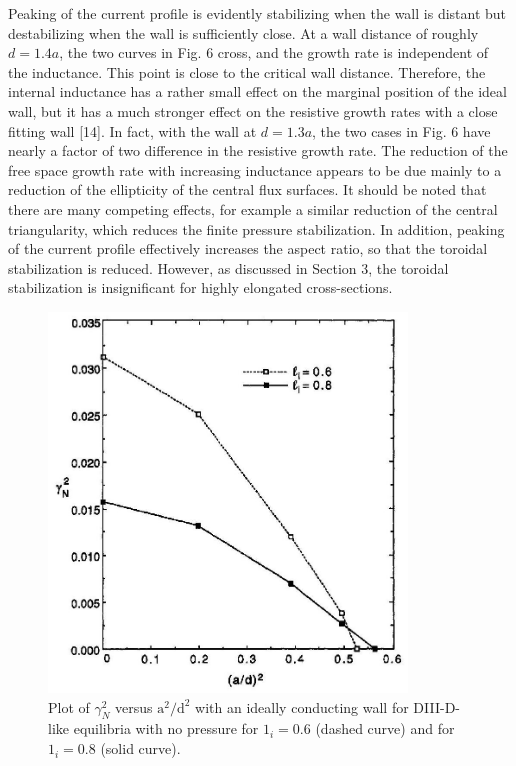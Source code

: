 \documentclass[utf8]{ctexart}
\begin{document}
\begin{sloppypar}
 Peaking of the current profile is evidently stabilizing when the wall is distant but destabilizing when the wall is sufficiently close. At a wall distance of roughly $d=1.4 a$, the two curves in Fig. 6 cross, and the growth rate is independent of the inductance. This point is close to the critical wall distance. Therefore, the internal inductance has a rather small effect on the marginal position of the ideal wall, but it has a much stronger effect on the resistive growth rates with a close fitting wall [14]. In fact, with the wall at $d=1.3 a$, the two cases in Fig. 6 have nearly a factor of two difference in the resistive growth rate. The reduction of the free space growth rate with increasing inductance appears to be due mainly to a reduction of the ellipticity of the central flux surfaces. It should be noted that there are many competing effects, for example a similar reduction of the central triangularity, which reduces the finite pressure stabilization. In addition, peaking of the current profile effectively increases the aspect ratio, so that the toroidal stabilization is reduced. However, as discussed in Section 3, the toroidal stabilization is insignificant for highly elongated cross-sections.
 \begin{figure}[H]
 	\centering
 	\includegraphics[max width=0.85\textwidth,max height=0.3\textheight]{2025_01_10_a0135324997886412d98g-7}
 	\caption{Plot of $\gamma_{N}^{2}$ versus $\mathrm{a}^{2} / \mathrm{d}^{2}$ with an ideally conducting wall for DIII-D-like equilibria with no pressure for $1_{i}=0.6$ (dashed curve) and for $1_{i}=0.8$ (solid curve).}
 	\label{fig6.}
 \end{figure}
 

\end{sloppypar}
\end{document}

